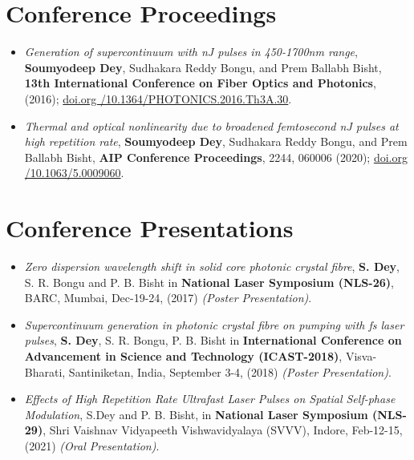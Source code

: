 \documentclass[11pt,a4paper,sans]{moderncv}        %
\begin{document}
\section{Conference Proceedings}
\begin{itemize}
	\item{\emph{Generation of supercontinuum with nJ pulses in 450-1700nm range}, \textbf{Soumyodeep Dey}, Sudhakara Reddy Bongu, and Prem Ballabh Bisht, \textbf{13th International Conference on Fiber Optics and Photonics}, (2016); \href{doi.org /10.1364/PHOTONICS.2016.Th3A.30}{\color{blue}doi.org /10.1364/PHOTONICS.2016.Th3A.30}.}
	
	\vspace{6pt}
	
	\item{\emph{Thermal and optical nonlinearity due to broadened femtosecond nJ pulses at high repetition rate}, \textbf{Soumyodeep Dey}, Sudhakara Reddy Bongu, and Prem Ballabh Bisht, \textbf{AIP Conference Proceedings}, 2244, 060006 (2020); \href{doi.org /10.1063/5.0009060}{\color{blue}doi.org /10.1063/5.0009060}.}
\end{itemize}

\section{Conference Presentations}
\begin{itemize}
	\item{\emph{Zero dispersion wavelength shift in solid core photonic crystal fibre}, \textbf{S. Dey}, S. R. Bongu and P. B. Bisht in \textbf{National Laser Symposium (NLS-26)}, BARC, Mumbai, Dec-19-24, (2017) \emph{(Poster Presentation)}.}
	
	\vspace{6pt}
	
	\item{\emph{Supercontinuum generation in photonic crystal fibre on pumping with fs laser pulses}, \textbf{S. Dey}, S. R. Bongu, P. B. Bisht in \textbf{International Conference on Advancement in Science and Technology (ICAST-2018)}, Visva-Bharati, Santiniketan, India, September 3-4, (2018) \emph{(Poster Presentation)}.}
	
	\vspace{6pt}
	
	\item{\emph{Effects of High Repetition Rate Ultrafast Laser Pulses on Spatial Self-phase Modulation}, S.Dey and  P. B. Bisht, in \textbf{National Laser Symposium (NLS-29)}, Shri Vaishnav Vidyapeeth Vishwavidyalaya (SVVV), Indore, Feb-12-15, (2021) \emph{(Oral Presentation)}.}
\end{itemize}
\end{document}
